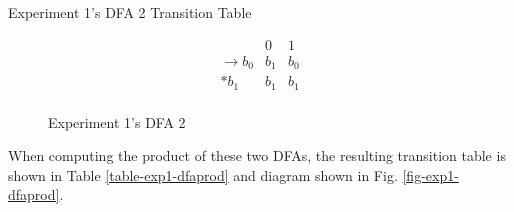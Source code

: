 \documentclass[conference]{IEEEtran}
\begin{document}
\begin{table}[h!]
    \caption{Experiment 1's DFA 2 Transition Table}
    \begin{displaymath}
        \begin{array}{r|c|c|}
        & 0 & 1 \\
        \hline
        \rightarrow b_0 & b_1 & b_0 \\
        * b_1 & b_1 & b_1 \\
        \end{array}
    \end{displaymath}
    \label{table-exp1-dfa2}
\end{table}
\begin{figure}[h!]
    \centering
    \caption{Experiment 1's DFA 2}
    \label{fig-exp1-dfa2}
\end{figure}

When computing the product of these two DFAs, the resulting transition table is shown in Table \ref{table-exp1-dfaprod} and diagram shown in Fig. \ref{fig-exp1-dfaprod}.
\end{document}

